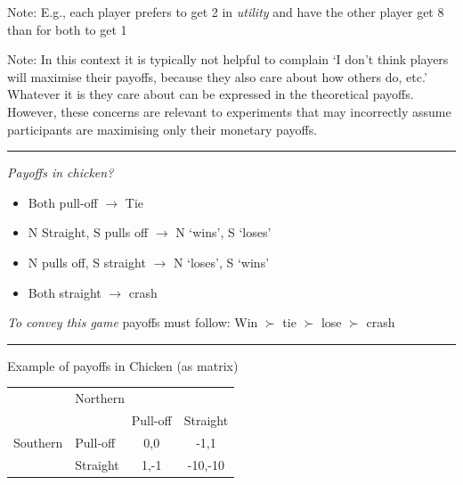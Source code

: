 \documentclass[]{article}
\begin{document}
Note: E.g., each player prefers to get 2 in \emph{utility} and have the
other player get 8 than for both to get 1

Note: In this context it is typically not helpful to complain `I don't
think players will maximise their payoffs, because they also care about
how others do, etc.' Whatever it is they care about can be expressed in
the theoretical payoffs.\\

However, these concerns are relevant to experiments that may incorrectly
assume participants are maximising only their monetary payoffs.\\

\begin{center}\rule{0.5\linewidth}{\linethickness}\end{center}

\emph{Payoffs in chicken?}

\begin{itemize}
\item
  Both pull-off \(\rightarrow\) Tie
\item
  N Straight, S pulls off \(\rightarrow\) N `wins', S `loses'
\item
  N pulls off, S straight \(\rightarrow\) N `loses', S `wins'
\item
  Both straight \(\rightarrow\) crash
\end{itemize}

\emph{To convey this game} payoffs must follow: Win \(\succ\) tie
\(\succ\) lose \(\succ\) crash

\begin{center}\rule{0.5\linewidth}{\linethickness}\end{center}

Example of payoffs in Chicken (as matrix)

\begin{center}
\begin{tabular}{llcc}
                              & \multicolumn{3}{l}{Northern}                                                                  \\ \cline{2-4}
\multicolumn{1}{l|}{}         & \multicolumn{1}{l|}{}          & \multicolumn{1}{l|}{Pull-off} & \multicolumn{1}{l|}{Straight} \\ \cline{2-4}
\multicolumn{1}{l|}{Southern} & \multicolumn{1}{l|}{Pull-off} & \multicolumn{1}{c|}{0,0}       & \multicolumn{1}{c|}{-1,1}    \\ \cline{2-4}
\multicolumn{1}{l|}{}         & \multicolumn{1}{l|}{Straight}    & \multicolumn{1}{c|}{1,-1}       & \multicolumn{1}{c|}{-10,-10}    \\ \cline{2-4}
\end{tabular}
\end{center}
\end{document}
